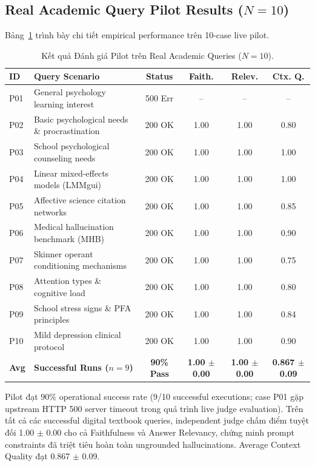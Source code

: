 \documentclass[10pt]{SPIIRAS_Proceedings}
\begin{document}
\subsection{Real Academic Query Pilot Results ($N=10$)}
Bảng~\ref{tab:pilot_results} trình bày chi tiết empirical performance trên 10-case live pilot.

\begin{table}[!t]
\centering
\caption{Kết quả Đánh giá Pilot trên Real Academic Queries ($N=10$).}
\label{tab:pilot_results}
\scriptsize
\setlength{\tabcolsep}{2.5pt}
\begin{tabularx}{\textwidth}{l>{\raggedright\arraybackslash}Xcccc}
\toprule
\textbf{ID} & \textbf{Query Scenario} & \textbf{Status} & \textbf{Faith.} & \textbf{Relev.} & \textbf{Ctx. Q.} \\
\midrule
P01 & General psychology learning interest & 500 Err & -- & -- & -- \\
P02 & Basic psychological needs \& procrastination & 200 OK & 1.00 & 1.00 & 0.80 \\
P03 & School psychological counseling needs & 200 OK & 1.00 & 1.00 & 1.00 \\
P04 & Linear mixed-effects models (LMMgui) & 200 OK & 1.00 & 1.00 & 1.00 \\
P05 & Affective science citation networks & 200 OK & 1.00 & 1.00 & 0.85 \\
P06 & Medical hallucination benchmark (MHB) & 200 OK & 1.00 & 1.00 & 0.90 \\
P07 & Skinner operant conditioning mechanisms & 200 OK & 1.00 & 1.00 & 0.75 \\
P08 & Attention types \& cognitive load & 200 OK & 1.00 & 1.00 & 0.80 \\
P09 & School stress signs \& PFA principles & 200 OK & 1.00 & 1.00 & 0.84 \\
P10 & Mild depression clinical protocol & 200 OK & 1.00 & 1.00 & 0.90 \\
\midrule
\textbf{Avg} & \textbf{Successful Runs ($n=9$)} & \textbf{90\% Pass} & \textbf{1.00 $\pm$ 0.00} & \textbf{1.00 $\pm$ 0.00} & \textbf{0.867 $\pm$ 0.09} \\
\bottomrule
\end{tabularx}
\end{table}

Pilot đạt 90\% operational success rate (9/10 successful executions; case P01 gặp upstream HTTP 500 server timeout trong quá trình live judge evaluation). Trên tất cả các successful digital textbook queries, independent judge chấm điểm tuyệt đối 1.00 $\pm$ 0.00 cho cả Faithfulness và Answer Relevancy, chứng minh prompt constraints đã triệt tiêu hoàn toàn ungrounded hallucinations. Average Context Quality đạt 0.867 $\pm$ 0.09.
\end{document}
